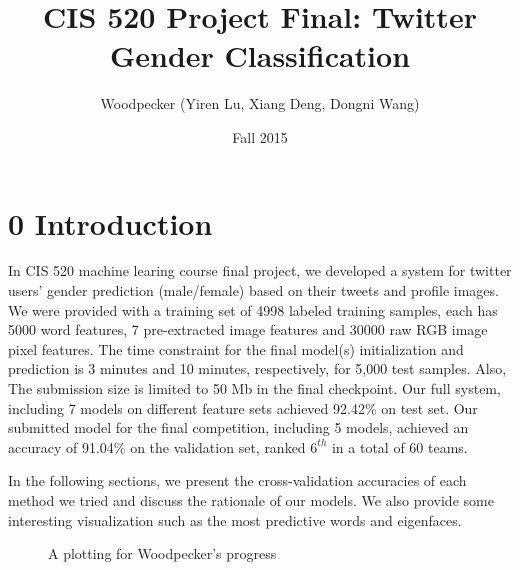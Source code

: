\documentclass[english]{article}
\title{CIS 520 Project Final: Twitter Gender Classification}
\author{Woodpecker (Yiren Lu, Xiang Deng, Dongni Wang)}
\date{Fall 2015}
\begin{document}
\maketitle



\section*{0 Introduction}
\indent \indent In CIS 520 machine learing course final project, we developed a system for twitter users'  gender prediction (male/female) based on their tweets and profile images. We were provided with a training set of 4998 labeled training samples, each has 5000 word features, 7 pre-extracted image features and 30000 raw RGB image pixel features. The time constraint for the final model(s) initialization and prediction is 3 minutes and 10 minutes, respectively, for 5,000 test samples. Also, The submission size is limited to 50 Mb in the final checkpoint. Our full system, including 7 models on different feature sets achieved 92.42\% on test set. Our submitted model for the final competition, including 5 models, achieved an accuracy of  91.04\% on the validation set, ranked $6^{th}$ in a total of 60 teams. \par
\par
In the following sections, we present the cross-validation accuracies of each method we tried and discuss the rationale of our models. We also provide some interesting visualization such as the most predictive words and eigenfaces. 
\\

\begin{figure}[h!]
\begin{center}
\caption{A plotting for Woodpecker's progress}
\label{ProcessPlot}
\end{center}
\end{figure}



\tableofcontents
\newpage



\end{document}
